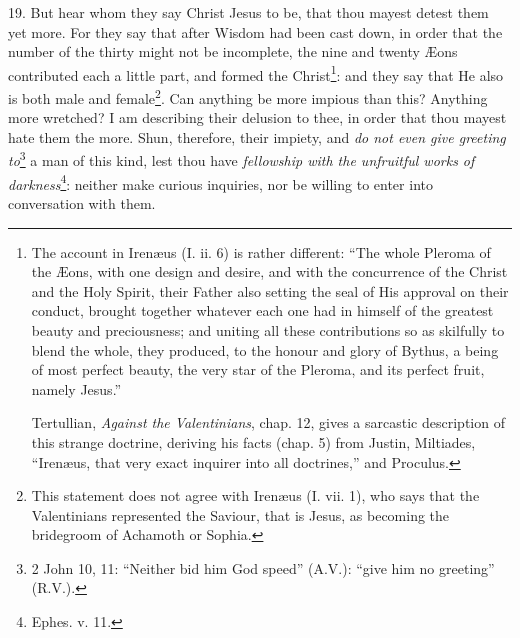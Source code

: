 19. But hear whom they say Christ Jesus to be, that thou mayest detest them yet more. For they say that after Wisdom had been cast down, in order that the number of the thirty might not be incomplete, the nine and twenty Æons contributed each a little part, and formed the Christ\footnote{The account in Irenæus (I. ii. 6) is rather different: “The whole Pleroma of the Æons, with one design and desire, and with the concurrence of the Christ and the Holy Spirit, their Father also setting the seal of His approval on their conduct, brought together whatever each one had in himself of the greatest beauty and preciousness; and uniting all these contributions so as skilfully to blend the whole, they produced, to the honour and glory of Bythus, a being of most perfect beauty, the very star of the Pleroma, and its perfect fruit, namely Jesus.” \par Tertullian, \emph{Against the Valentinians}, chap. 12, gives a sarcastic description of this strange doctrine, deriving his facts (chap. 5) from Justin, Miltiades, “Irenæus, that very exact inquirer into all doctrines,” and Proculus.}: and they say that He also is both male and female\footnote{This statement does not agree with Irenæus (I. vii. 1), who says that the Valentinians represented the Saviour, that is Jesus, as becoming the bridegroom of Achamoth or Sophia.}. Can anything be more impious than this? Anything more wretched? I am describing their delusion to thee, in order that thou mayest hate them the more. Shun, therefore, their impiety, and \emph{do not even give greeting to}\footnote{2 John 10, 11: “Neither bid him God speed” (\textsc{A.V}.): “give him no greeting” (\textsc{R.V.}).} a man of this kind, lest thou have \emph{fellowship with the unfruitful works of darkness}\footnote{Ephes. v. 11.}: neither make curious inquiries, nor be willing to enter into conversation with them.

